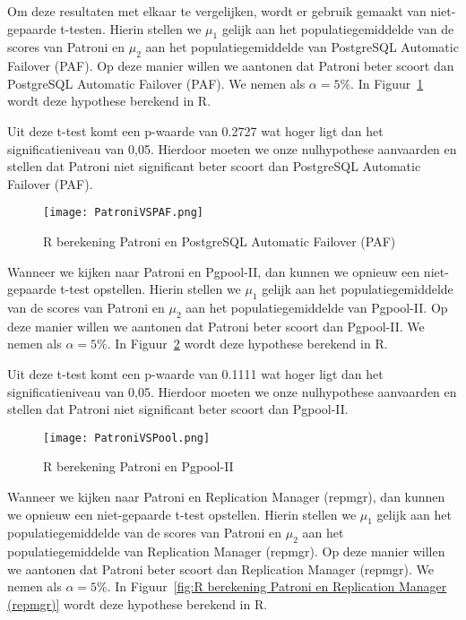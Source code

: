 Om deze resultaten met elkaar te vergelijken, wordt er gebruik gemaakt van niet-gepaarde t-testen. Hierin stellen we $\mu_1$ gelijk aan het populatiegemiddelde van de scores van Patroni en $\mu_2$ aan het populatiegemiddelde van PostgreSQL Automatic Failover (PAF). Op deze manier willen we aantonen dat Patroni beter scoort dan PostgreSQL Automatic Failover (PAF). We nemen als $\alpha = 5\%$. In Figuur~\ref{fig:R berekening Patroni en PostgreSQL Automatic Failover (PAF)} wordt deze hypothese berekend in R.

Uit deze t-test komt een p-waarde van 0.2727 wat hoger ligt dan het significatieniveau van 0,05. Hierdoor moeten we onze nulhypothese aanvaarden en stellen dat Patroni niet significant beter scoort dan PostgreSQL Automatic Failover (PAF). 

\begin{figure}[!h]
    \centering
    \texttt{[image: PatroniVSPAF.png]}
    \caption{R berekening Patroni en PostgreSQL Automatic Failover (PAF)}
    \label{fig:R berekening Patroni en PostgreSQL Automatic Failover (PAF)}
\end{figure}

Wanneer we kijken naar Patroni en Pgpool-II, dan kunnen we opnieuw een niet-gepaarde t-test opstellen. Hierin stellen we $\mu_1$ gelijk aan het populatiegemiddelde van de scores van Patroni en $\mu_2$ aan het populatiegemiddelde van Pgpool-II. Op deze manier willen we aantonen dat Patroni beter scoort dan Pgpool-II. We nemen als $\alpha = 5\%$. In Figuur~\ref{fig:R berekening Patroni en Pgpool-II} wordt deze hypothese berekend in R.

Uit deze t-test komt een p-waarde van 0.1111 wat hoger ligt dan het significatieniveau van 0,05. Hierdoor moeten we onze nulhypothese aanvaarden en stellen dat Patroni niet significant beter scoort dan Pgpool-II.

\begin{figure}[!h]
    \centering
    \texttt{[image: PatroniVSPool.png]}
    \caption{R berekening Patroni en Pgpool-II}
    \label{fig:R berekening Patroni en Pgpool-II}
\end{figure}

Wanneer we kijken naar Patroni en Replication Manager (repmgr), dan kunnen we opnieuw een niet-gepaarde t-test opstellen. Hierin stellen we $\mu_1$ gelijk aan het populatiegemiddelde van de scores van Patroni en $\mu_2$ aan het populatiegemiddelde van Replication Manager (repmgr). Op deze manier willen we aantonen dat Patroni beter scoort dan Replication Manager (repmgr). We nemen als $\alpha = 5\%$. In Figuur~\ref{fig:R berekening Patroni en Replication Manager (repmgr)} wordt deze hypothese berekend in R.

